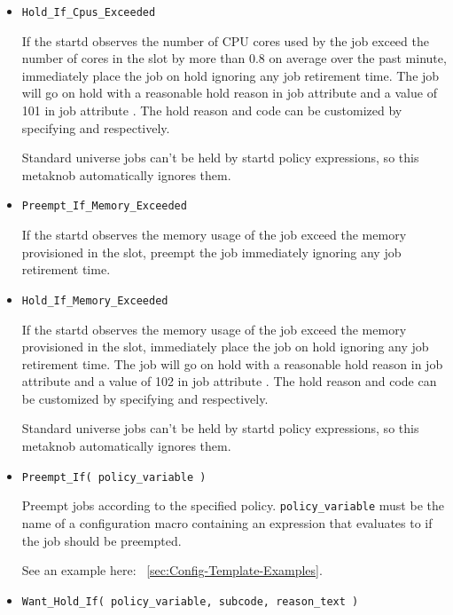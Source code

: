 \begin{description}
\begin{itemize}
	\item \texttt{Hold\_If\_Cpus\_Exceeded}

	If the startd observes the number of CPU cores used by the job exceed
	the number of cores in the slot by more than 0.8 on average over the past
	minute, immediately place the job on hold
	ignoring any job retirement time.  The job will go on hold with a reasonable
	hold reason in job attribute  and a value of 101 in job
	attribute .  The hold reason and code can be customized by
	specifying  and
	 respectively.

	Standard universe jobs can't be held by startd policy expressions,
	so this metaknob automatically ignores them.

	\item \texttt{Preempt\_If\_Memory\_Exceeded}

	If the startd observes the memory usage of the job exceed
	the memory provisioned in the slot, preempt the job immediately
	ignoring any job retirement time.

	\item \texttt{Hold\_If\_Memory\_Exceeded}

	If the startd observes the memory usage of the job exceed
	the memory provisioned in the slot,
	immediately place the job on hold
	ignoring any job retirement time.
	The job will go on hold with a reasonable
	hold reason in job attribute  and a value of 102 in job
	attribute .  The hold reason and code can be customized by
	specifying  and
	 respectively.

	Standard universe jobs can't be held by startd policy expressions,
	so this metaknob automatically ignores them.

	\item \texttt{Preempt\_If( policy\_variable )}

	Preempt jobs according to the specified policy.
	\texttt{policy\_variable} must be the name of a configuration macro
	containing an expression that evaluates to  if the job
	should be preempted.

	See an example here: ~\ref{sec:Config-Template-Examples}.

	\item \texttt{Want\_Hold\_If( policy\_variable, subcode, reason\_text )}


\end{itemize}
\end{description}
